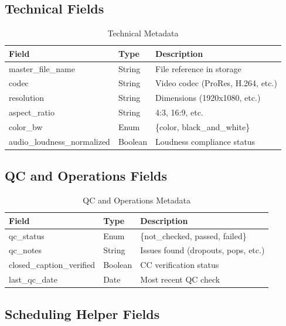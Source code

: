 \documentclass[12pt,letterpaper,twoside]{report}
\begin{document}
\subsection{Technical Fields}

\begin{table}[H]
\centering
\caption{Technical Metadata}
\label{tab:meta-technical}
\begin{tabular}{@{}L{4.5cm}L{3cm}L{6cm}@{}}
\toprule
\textbf{Field} & \textbf{Type} & \textbf{Description} \\
\midrule
master\_\allowbreak file\_\allowbreak name & String & File reference in storage \\
codec & String & Video codec (ProRes, H.264, etc.) \\
resolution & String & Dimensions (1920x1080, etc.) \\
aspect\_\allowbreak ratio & String & 4:3, 16:9, etc. \\
color\_\allowbreak bw & Enum & \{color, black\_\allowbreak and\_\allowbreak white\} \\
audio\_\allowbreak loudness\_\allowbreak normalized & Boolean & Loudness compliance status \\
\bottomrule
\end{tabular}
\end{table}

\subsection{QC and Operations Fields}

\begin{table}[H]
\centering
\caption{QC and Operations Metadata}
\label{tab:meta-qc}
\begin{tabular}{@{}L{4.5cm}L{3cm}L{6cm}@{}}
\toprule
\textbf{Field} & \textbf{Type} & \textbf{Description} \\
\midrule
qc\_\allowbreak status & Enum & \{not\_\allowbreak checked, passed, failed\} \\
qc\_\allowbreak notes & String & Issues found (dropouts, pops, etc.) \\
closed\_\allowbreak caption\_\allowbreak verified & Boolean & CC verification status \\
last\_\allowbreak qc\_\allowbreak date & Date & Most recent QC check \\
\bottomrule
\end{tabular}
\end{table}

\subsection{Scheduling Helper Fields}
\end{document}
